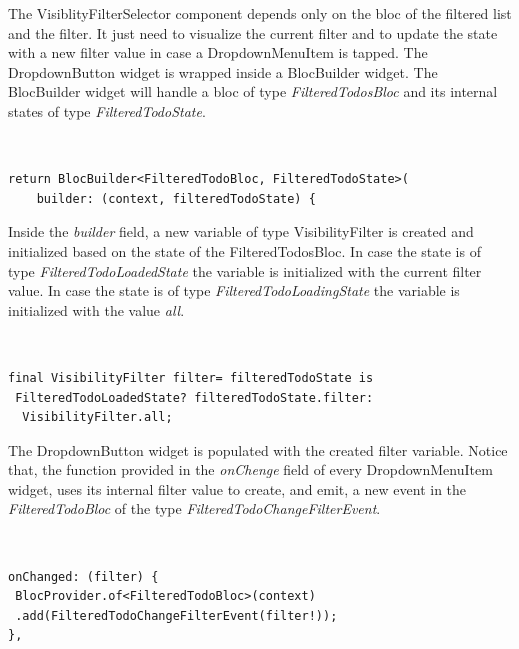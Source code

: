 The VisiblityFilterSelector component depends only on the bloc of the filtered list and the filter. It just need to visualize the current filter and to update the state with a new filter value in case a DropdownMenuItem is tapped. The DropdownButton widget is wrapped inside a BlocBuilder widget. The BlocBuilder widget will handle a bloc of type \textit{FilteredTodosBloc} and its internal states of type \textit{FilteredTodoState}. 
\begin{code}
\mbox{}\\
 \mbox{}
\label{code:2.14}
\begin{verbatim}
return BlocBuilder<FilteredTodoBloc, FilteredTodoState>(
    builder: (context, filteredTodoState) {
\end{verbatim}
\mbox{}
\end{code}

Inside the \textit{builder }field, a new variable of type VisibilityFilter is created and initialized based on the state of the FilteredTodosBloc. In case the state is of type \textit{FilteredTodoLoadedState} the variable is initialized with the current filter value. In case the state is of type \textit{FilteredTodoLoadingState} the variable is initialized with the value \textit{all}.
\begin{code}
\mbox{}\\
 \mbox{}
\label{code:2.14}
\begin{verbatim}
final VisibilityFilter filter= filteredTodoState is
 FilteredTodoLoadedState? filteredTodoState.filter:
  VisibilityFilter.all;
\end{verbatim}
\mbox{}
\end{code}

The DropdownButton widget is populated with the created filter variable. Notice that, the function provided in the \textit{onChenge} field of every DropdownMenuItem widget, uses its internal filter value to create, and  emit, a new event in the \textit{FilteredTodoBloc} of the type \textit{FilteredTodoChangeFilterEvent}.
\begin{code}
\mbox{}\\
 \mbox{}
\label{code:2.14}
\begin{verbatim}
onChanged: (filter) {
 BlocProvider.of<FilteredTodoBloc>(context)
 .add(FilteredTodoChangeFilterEvent(filter!));
},
\end{verbatim}
\mbox{}
\end{code}
